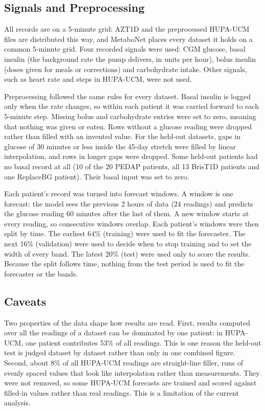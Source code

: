 \subsection{Signals and Preprocessing}

All records are on a 5-minute grid: AZT1D and the preprocessed HUPA-UCM files are distributed this way, and MetaboNet places every dataset it holds on a common 5-minute grid. Four recorded signals were used: CGM glucose, basal insulin (the background rate the pump delivers, in units per hour), bolus insulin (doses given for meals or corrections) and carbohydrate intake. Other signals, such as heart rate and steps in HUPA-UCM, were not used.

Preprocessing followed the same rules for every dataset. Basal insulin is logged only when the rate changes, so within each patient it was carried forward to each 5-minute step. Missing bolus and carbohydrate entries were set to zero, meaning that nothing was given or eaten. Rows without a glucose reading were dropped rather than filled with an invented value. For the held-out datasets, gaps in glucose of 30 minutes or less inside the 45-day stretch were filled by linear interpolation, and rows in longer gaps were dropped. Some held-out patients had no basal record at all (10 of the 20 PEDAP patients, all 13 BrisT1D patients and one ReplaceBG patient). Their basal input was set to zero.

Each patient's record was turned into forecast windows. A window is one forecast: the model sees the previous 2 hours of data (24 readings) and predicts the glucose reading 60 minutes after the last of them. A new window starts at every reading, so consecutive windows overlap. Each patient's windows were then split by time. The earliest 64\% (training) were used to fit the forecaster. The next 16\% (validation) were used to decide when to stop training and to set the width of every band. The latest 20\% (test) were used only to score the results. Because the split follows time, nothing from the test period is used to fit the forecaster or the bands.

\subsection{Caveats}

Two properties of the data shape how results are read. First, results computed over all the readings of a dataset can be dominated by one patient: in HUPA-UCM, one patient contributes 53\% of all readings. This is one reason the held-out test is judged dataset by dataset rather than only in one combined figure. Second, about 8\% of all HUPA-UCM readings are straight-line filler, runs of evenly spaced values that look like interpolation rather than measurements. They were not removed, so some HUPA-UCM forecasts are trained and scored against filled-in values rather than real readings. This is a limitation of the current analysis.

